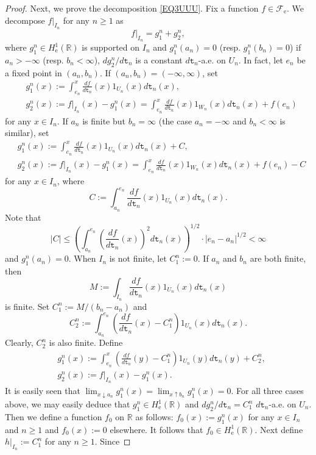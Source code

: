 \documentclass[a4paper]{amsart}
\theoremstyle{definition}
\theoremstyle{remark}
\numberwithin{equation}{section}
\begin{document}
\begin{proof}
Next, we prove the decomposition \eqref{EQ3UUU}. Fix a function $f\in {{\mathcal{F}}}_\mathrm{e}$. We decompose $f|_{I_n}$ for any $n\geq 1$ as
\[
	f|_{I_n}=g^n_1+g^n_2,
\]
where $g^n_1\in H^1_\mathrm{e}(\mathbb{R})$ is supported on $I_n$ and $g^n_1(a_n)=0$ (resp. $g^n_1(b_n)=0$) if $a_n>-\infty$ (resp. $b_n<\infty$), $dg^n_2/d{{\mathtt{t}}}_n$ is a constant $d{{\mathtt{t}}}_n$-a.e. on $U_n$. In fact, let $e_n$ be a fixed point in $(a_n,b_n)$. If $(a_n,b_n)=(-\infty, \infty)$, set
\[
\begin{aligned}
	&g^n_1(x):=\int_{e_n}^x \frac{df}{d{{\mathtt{t}}}_n}(x)1_{U_n}(x)d{{\mathtt{t}}}_n(x), \\
	&g^n_2(x):=f|_{I_n}(x)-g^n_1(x)=\int_{e_n}^x \frac{df}{d{{\mathtt{t}}}_n}(x)1_{W_n}(x)d{{\mathtt{t}}}_n(x)+f(e_n)
\end{aligned}\]
for any $x\in I_n$. If $a_n$ is finite but $b_n=\infty$ (the case $a_n=-\infty$ and $b_n<\infty$ is similar), set
\[
\begin{aligned}
&g^n_1(x):= \int_{e_n}^x \frac{df}{d{{\mathtt{t}}}_n}(x)1_{U_n}(x)d{{\mathtt{t}}}_n(x)+C, \\
&g^n_2(x):=f|_{I_n}(x)-g^n_1(x)= \int_{e_n}^x \frac{df}{d{{\mathtt{t}}}_n}(x)1_{W_n}(x)d{{\mathtt{t}}}_n(x)+f(e_n)-C
\end{aligned}
\]
for any $x\in I_n$, where
\[
	C:=\int_{a_n}^{e_n} \frac{df}{d{{\mathtt{t}}}_n}(x)1_{U_n}(x)d{{\mathtt{t}}}_n(x).
\]
Note that
\[
|C|\leq \left(\int_{a_n}^{e_n}\left(\frac{df}{d{{\mathtt{t}}}_n}(x)\right)^2d{{\mathtt{t}}}_n(x)\right)^{1/2}\cdot |e_n-a_n|^{1/2}<\infty
\]	
and $g^n_1(a_n)=0$. When $I_n$ is not finite, let $C^n_1:=0$. If $a_n$ and $b_n$ are both finite, then
\[
	M:= \int_{I_n}\frac{df}{d{{\mathtt{t}}}_n}(x)1_{U_n}(x)d{{\mathtt{t}}}_n(x)
\]
is finite. Set $C^n_1:=M/(b_n-a_n)$ and
\[
	C^n_2:= \int_{a_n}^{e_n}\left( \frac{df}{d{{\mathtt{t}}}_n}(x)-C^n_1\right)1_{U_n}(x)d{{\mathtt{t}}}_n(x).
\]
Clearly, $C^n_2$ is also finite. Define
\[
\begin{aligned}
	&g^n_1(x):=\int_{e_n}^x \left( \frac{df}{d{{\mathtt{t}}}_n}(y)-C^n_1\right)1_{U_n}(y)d{{\mathtt{t}}}_n(y)+C^n_2, \\
	&g^n_2(x):=f|_{I_n}(x)-g^n_1(x).
\end{aligned}\]
It is easily seen that $\lim_{x\downarrow a_n}g^n_1(x)=\lim_{x\uparrow b_n}g^n_1(x)=0$. For all three cases above, we may easily deduce that $g^n_1\in H^1_\mathrm{e}(\mathbb{R})$  and $dg^n_2/d{{\mathtt{t}}}_n=C^n_1$ $d{{\mathtt{t}}}_n$-a.e. on $U_n$. Then we define a function $f_0$ on $\mathbb{R}$ as follows: $f_0(x):=g^n_1(x)$ for any $x\in I_n$ and $n\geq 1$ and $f_0(x):=0$ elsewhere. It follows that $f_0\in H^1_\mathrm{e}(\mathbb{R})$. Next define $h|_{I_n}:=C^n_1$ for any $n\geq 1$. Since

\end{proof}
\end{document}
